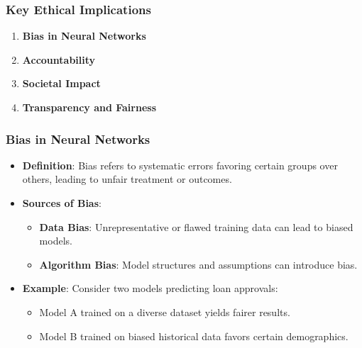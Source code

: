 \documentclass[aspectratio=169]{beamer}
\begin{document}
\begin{frame}[fragile]
  \frametitle{Key Ethical Implications}
  \begin{enumerate}
    \item \textbf{Bias in Neural Networks}
    \item \textbf{Accountability}
    \item \textbf{Societal Impact}
    \item \textbf{Transparency and Fairness}
  \end{enumerate}
\end{frame}

\begin{frame}[fragile]
  \frametitle{Bias in Neural Networks}
  \begin{itemize}
    \item \textbf{Definition}:
      Bias refers to systematic errors favoring certain groups over others, leading to unfair treatment or outcomes.
  
    \item \textbf{Sources of Bias}:
      \begin{itemize}
        \item \textbf{Data Bias}: Unrepresentative or flawed training data can lead to biased models.
        \item \textbf{Algorithm Bias}: Model structures and assumptions can introduce bias.
      \end{itemize}
  
    \item \textbf{Example}: 
      Consider two models predicting loan approvals:
      \begin{itemize}
        \item Model A trained on a diverse dataset yields fairer results.
        \item Model B trained on biased historical data favors certain demographics.
      \end{itemize}
  \end{itemize}
\end{frame}
\end{document}
